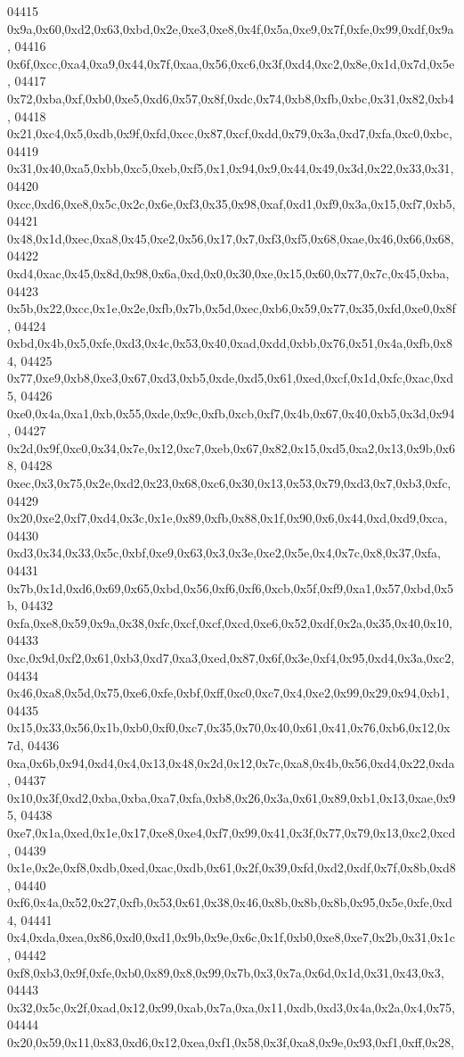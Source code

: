 \begin{DoxyCode}
04415   0x9a,0x60,0xd2,0x63,0xbd,0x2e,0xe3,0xe8,0x4f,0x5a,0xe9,0x7f,0xfe,0x99,0xdf,0x9a,
04416   0x6f,0xcc,0xa4,0xa9,0x44,0x7f,0xaa,0x56,0xc6,0x3f,0xd4,0xc2,0x8e,0x1d,0x7d,0x5e,
04417   0x72,0xba,0xf,0xb0,0xe5,0xd6,0x57,0x8f,0xdc,0x74,0xb8,0xfb,0xbc,0x31,0x82,0xb4,
04418   0x21,0xc4,0x5,0xdb,0x9f,0xfd,0xcc,0x87,0xcf,0xdd,0x79,0x3a,0xd7,0xfa,0xc0,0xbc,
04419   0x31,0x40,0xa5,0xbb,0xc5,0xeb,0xf5,0x1,0x94,0x9,0x44,0x49,0x3d,0x22,0x33,0x31,
04420   0xcc,0xd6,0xe8,0x5c,0x2c,0x6e,0xf3,0x35,0x98,0xaf,0xd1,0xf9,0x3a,0x15,0xf7,0xb5,
04421   0x48,0x1d,0xec,0xa8,0x45,0xe2,0x56,0x17,0x7,0xf3,0xf5,0x68,0xae,0x46,0x66,0x68,
04422   0xd4,0xac,0x45,0x8d,0x98,0x6a,0xd,0x0,0x30,0xe,0x15,0x60,0x77,0x7c,0x45,0xba,
04423   0x5b,0x22,0xcc,0x1e,0x2e,0xfb,0x7b,0x5d,0xec,0xb6,0x59,0x77,0x35,0xfd,0xe0,0x8f,
04424   0xbd,0x4b,0x5,0xfe,0xd3,0x4c,0x53,0x40,0xad,0xdd,0xbb,0x76,0x51,0x4a,0xfb,0x84,
04425   0x77,0xe9,0xb8,0xe3,0x67,0xd3,0xb5,0xde,0xd5,0x61,0xed,0xcf,0x1d,0xfc,0xac,0xd5,
04426   0xe0,0x4a,0xa1,0xb,0x55,0xde,0x9c,0xfb,0xcb,0xf7,0x4b,0x67,0x40,0xb5,0x3d,0x94,
04427   0x2d,0x9f,0xc0,0x34,0x7e,0x12,0xc7,0xeb,0x67,0x82,0x15,0xd5,0xa2,0x13,0x9b,0x68,
04428   0xec,0x3,0x75,0x2e,0xd2,0x23,0x68,0xc6,0x30,0x13,0x53,0x79,0xd3,0x7,0xb3,0xfc,
04429   0x20,0xe2,0xf7,0xd4,0x3c,0x1e,0x89,0xfb,0x88,0x1f,0x90,0x6,0x44,0xd,0xd9,0xca,
04430   0xd3,0x34,0x33,0x5c,0xbf,0xe9,0x63,0x3,0x3e,0xe2,0x5e,0x4,0x7c,0x8,0x37,0xfa,
04431   0x7b,0x1d,0xd6,0x69,0x65,0xbd,0x56,0xf6,0xf6,0xcb,0x5f,0xf9,0xa1,0x57,0xbd,0x5b,
04432   0xfa,0xe8,0x59,0x9a,0x38,0xfc,0xcf,0xcf,0xcd,0xe6,0x52,0xdf,0x2a,0x35,0x40,0x10,
04433   0xc,0x9d,0xf2,0x61,0xb3,0xd7,0xa3,0xed,0x87,0x6f,0x3e,0xf4,0x95,0xd4,0x3a,0xc2,
04434   0x46,0xa8,0x5d,0x75,0xe6,0xfe,0xbf,0xff,0xc0,0xc7,0x4,0xe2,0x99,0x29,0x94,0xb1,
04435   0x15,0x33,0x56,0x1b,0xb0,0xf0,0xc7,0x35,0x70,0x40,0x61,0x41,0x76,0xb6,0x12,0x7d,
04436   0xa,0x6b,0x94,0xd4,0x4,0x13,0x48,0x2d,0x12,0x7c,0xa8,0x4b,0x56,0xd4,0x22,0xda,
04437   0x10,0x3f,0xd2,0xba,0xba,0xa7,0xfa,0xb8,0x26,0x3a,0x61,0x89,0xb1,0x13,0xae,0x95,
04438   0xe7,0x1a,0xed,0x1e,0x17,0xe8,0xe4,0xf7,0x99,0x41,0x3f,0x77,0x79,0x13,0xc2,0xcd,
04439   0x1e,0x2e,0xf8,0xdb,0xed,0xac,0xdb,0x61,0x2f,0x39,0xfd,0xd2,0xdf,0x7f,0x8b,0xd8,
04440   0xf6,0x4a,0x52,0x27,0xfb,0x53,0x61,0x38,0x46,0x8b,0x8b,0x8b,0x95,0x5e,0xfe,0xd4,
04441   0x4,0xda,0xea,0x86,0xd0,0xd1,0x9b,0x9e,0x6c,0x1f,0xb0,0xe8,0xe7,0x2b,0x31,0x1c,
04442   0xf8,0xb3,0x9f,0xfe,0xb0,0x89,0x8,0x99,0x7b,0x3,0x7a,0x6d,0x1d,0x31,0x43,0x3,
04443   0x32,0x5c,0x2f,0xad,0x12,0x99,0xab,0x7a,0xa,0x11,0xdb,0xd3,0x4a,0x2a,0x4,0x75,
04444   0x20,0x59,0x11,0x83,0xd6,0x12,0xea,0xf1,0x58,0x3f,0xa8,0x9e,0x93,0xf1,0xff,0x28,

\end{DoxyCode}

